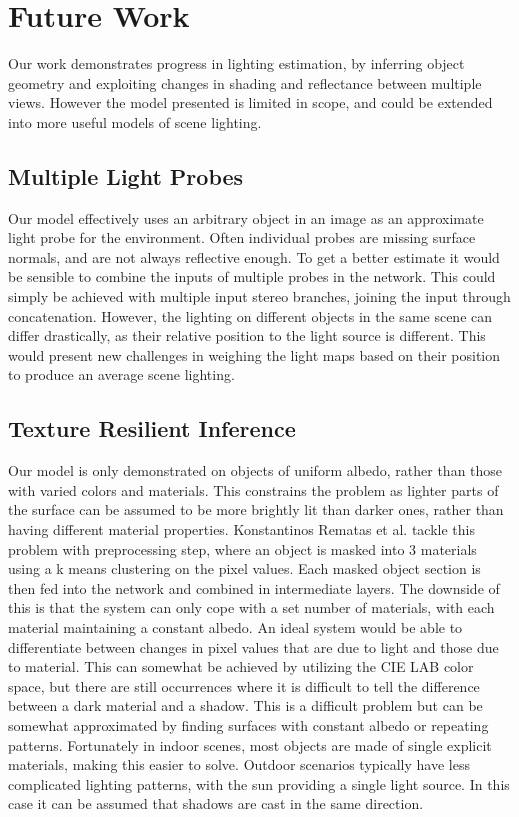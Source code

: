 \documentclass[ %
                    author={Gavin Parker},
                supervisor={Dr. Neill Campbell},
                    degree={MEng},
                     title={Deep Siamese Networks for Illumination Estimation from Stereo Images},
                  subtitle={},
                      type={Research},
                      year={2018} ]{dissertation}
\begin{document}
\section{Future Work}
Our work demonstrates progress in lighting estimation, by inferring object geometry and exploiting changes in shading and reflectance between multiple views. However the model presented is limited in scope, and could be extended into more useful models of scene lighting.
\subsection{Multiple Light Probes}
Our model effectively uses an arbitrary object in an image as an approximate light probe for the environment. Often individual probes are missing surface normals, and are not always reflective enough. To get a better estimate it would be sensible to combine the inputs of multiple probes in the network. This could simply be achieved with multiple input stereo branches, joining the input through concatenation. However, the lighting on different objects in the same scene can differ drastically, as their relative position to the light source is different. This would present new challenges in weighing the light maps based on their position to produce an average scene lighting.
\subsection{Texture Resilient Inference}
Our model is only demonstrated on objects of uniform albedo, rather than those with varied colors and materials. This constrains the problem as lighter parts of the surface can be assumed to be more brightly lit than darker ones, rather than having different material properties. Konstantinos Rematas et al. tackle this problem with  preprocessing step, where an object is masked into 3 materials using a k means clustering on the pixel values. Each masked object section is then fed into the network and combined in intermediate layers. The downside of this is that the system can only cope with a set number of materials, with each material maintaining a constant albedo. An ideal system would be able to differentiate between changes in pixel values that are due to light and those due to material. This can somewhat be achieved by utilizing the CIE LAB color space, but there are still occurrences where it is difficult to tell the difference between a dark material and a shadow. This is a difficult problem but can be somewhat approximated by finding surfaces with constant albedo or repeating patterns. Fortunately in indoor scenes, most objects are made of single explicit materials, making this easier to solve. Outdoor scenarios typically have less complicated lighting patterns, with the sun providing a single light source. In this case it can be assumed that shadows are cast in the same direction.
\end{document}
